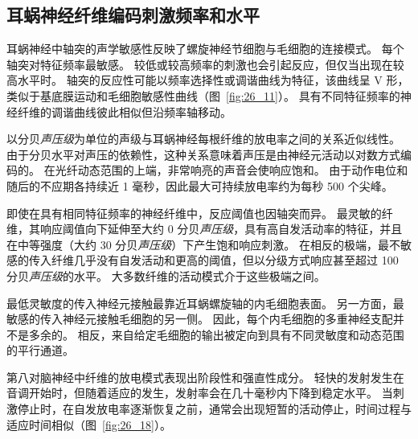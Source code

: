\subsection{耳蜗神经纤维编码刺激频率和水平}

耳蜗神经中轴突的声学敏感性反映了螺旋神经节细胞与毛细胞的连接模式。
每个轴突对特征频率最敏感。
较低或较高频率的刺激也会引起反应，但仅当出现在较高水平时。
轴突的反应性可能以频率选择性或调谐曲线为特征，该曲线呈 V 形，类似于基底膜运动和毛细胞敏感性曲线（图~\ref{fig:26_11}）。
具有不同特征频率的神经纤维的调谐曲线彼此相似但沿频率轴移动。


以分贝\textit{声压级}为单位的声级与耳蜗神经每根纤维的放电率之间的关系近似线性。
由于分贝水平对声压的依赖性，这种关系意味着声压是由神经元活动以对数方式编码的。
在光纤动态范围的上端，非常响亮的声音会使响应饱和。
由于动作电位和随后的不应期各持续近 1 毫秒，因此最大可持续放电率约为每秒 500 个尖峰。


即使在具有相同特征频率的神经纤维中，反应阈值也因轴突而异。 最灵敏的纤维，其响应阈值向下延伸至大约 0 分贝\textit{声压级}，具有高自发活动率的特征，并且在中等强度（大约 30 分贝\textit{声压级}）下产生饱和响应刺激。
在相反的极端，最不敏感的传入纤维几乎没有自发活动和更高的阈值，但以分级方式响应甚至超过 100 分贝\textit{声压级}的水平。
大多数纤维的活动模式介于这些极端之间。


最低灵敏度的传入神经元接触最靠近耳蜗螺旋轴的内毛细胞表面。
另一方面，最敏感的传入神经元接触毛细胞的另一侧。
因此，每个内毛细胞的多重神经支配并不是多余的。
相反，来自给定毛细胞的输出被定向到具有不同灵敏度和动态范围的平行通道。


第八对脑神经中纤维的放电模式表现出阶段性和强直性成分。
轻快的发射发生在音调开始时，但随着适应的发生，发射率会在几十毫秒内下降到稳定水平。
当刺激停止时，在自发放电率逐渐恢复之前，通常会出现短暂的活动停止，时间过程与适应时间相似（图~\ref{fig:26_18}）。


